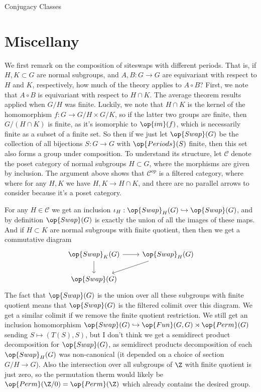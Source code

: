 \documentclass[12nt]{article}
\theoremstyle{plain}
\begin{document}
\begin{subsection}{Conjugacy Classes}
\section{Miscellany}

We first remark on the composition of siteswaps with different periods. That is, if $H, K \subset G$ are normal subgroups, and $A, B : G \to G$ are equivariant with respect to $H$ and $K$, respectively, how much of the theory applies to $A \circ B$? First, we note that $A \circ B$ is equivariant with respect to $H \cap K$. The average theorem results applied when $G/H$ was finite. Luckily, we note that $H \cap K$ is the kernel of the homomorphism $f : G \to G/H \times G/K$, so if the latter two groups are finite, then $G/(H \cap K)$ is finite, as it's isomorphic to $\op{im}(f)$, which is necessarily finite as a subset of a finite set. So then if we just let $\op{Swap}(G)$ be the collection of all bijections $S : G \to G$ with $\op{Periods}(S)$ finite, then this set also forms a group under composition. To understand its structure, let $\mathcal{C}$ denote the poset category of normal subgroups $H \subset G$, where the morphisms are given by inclusion. The argument above shows that $\mathcal{C}^{op}$ is a filtered category, where where for any $H, K$ we have $H, K \to H \cap K$, and there are no parallel arrows to consider because it's a poset category. 

For any $H \in \mathcal{C}$ we get an inclusion $\iota_H : \op{Swap}_H(G) \hookrightarrow \op{Swap}(G)$, and by definition $\op{Swap}(G)$ is exactly the union of all the images of these maps. And if $H \subset K$ are normal subgroups with finite quotient, then then we get a commutative diagram
\[
\begin{tikzcd}
\op{Swap}_K(G) \ar[r] \ar[d] & \op{Swap}_H(G) \ar[dl] \\
\op{Swap}(G)
\end{tikzcd}
\]
The fact that $\op{Swap}(G)$ is the union over all these subgroups with finite quotient means that $\op{Swap}(G)$ is the filtered colimit over this diagram. We get a similar colimit if we remove the finite quotient restriction. We still get an inclusion homomorphism $\op{Swap}(G) \hookrightarrow \op{Fun}(G, G) \rtimes \op{Perm}(G)$ sending $S \mapsto (T(S), S)$, but I don't think we get a semidirect product decomposition for $\op{Swap}(G)$, as semidirect products decomposition of each $\op{Swap}_H(G)$ was non-canonical (it depended on a choice of section $G/H \to G$). Also the intersection over all subgroups of $\Z$ with finite quotient is just zero, so the permutation therm would likely be $\op{Perm}(\Z/0) = \op{Perm}(\Z)$ which already contains the desired group. 




\end{subsection}
\end{document}
